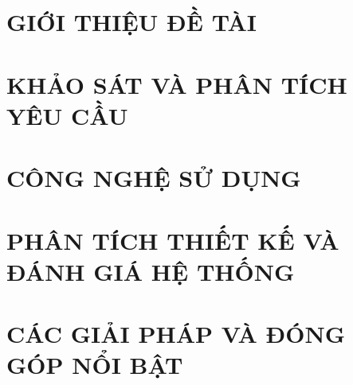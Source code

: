 \documentclass[a4paper,13pt,3p,twoside]{report}
\theoremstyle{definition}
\begin{document}
\glsaddall 
 \renewcommand*{\glossaryname}{Danh sách thuật ngữ}
\renewcommand*{\acronymname}{DANH MỤC THUẬT NGỮ VÀ TỪ VIẾT TẮT}
\renewcommand*{\entryname}{Thuật ngữ}
\renewcommand*{\descriptionname}{Ý nghĩa}
\printnoidxglossaries

 \newpage
 

%


\newpage
{}

\pagestyle{fancy}
\fancyhf{}
\fancyhead[RE, LO]{\leftmark}
\fancyfoot[RE, LO]{\thepage}

\chapter{GIỚI THIỆU ĐỀ TÀI}
\label{chapter:Introduction}

\newpage
\chapter{KHẢO SÁT VÀ PHÂN TÍCH YÊU CẦU}
\label{chapter:Related_works}



\newpage
\chapter{CÔNG NGHỆ SỬ DỤNG}
\label{chapter:Methodology}


\newpage
\chapter{PHÂN TÍCH THIẾT KẾ VÀ ĐÁNH GIÁ HỆ THỐNG}
\label{chapter:Experiment}


\newpage
\chapter{CÁC GIẢI PHÁP VÀ ĐÓNG GÓP NỔI BẬT}
\label{chapter:SolutionAndContribution}

\newpage
\end{document}

